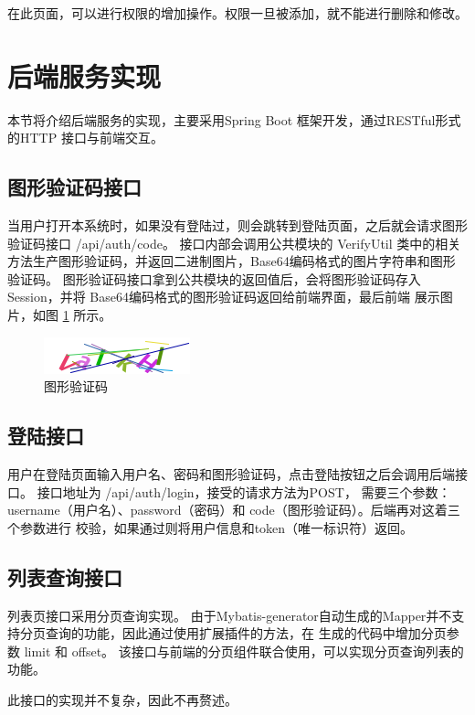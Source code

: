 在此页面，可以进行权限的增加操作。权限一旦被添加，就不能进行删除和修改。

\section{后端服务实现}
本节将介绍后端服务的实现，主要采用Spring Boot 框架开发，通过RESTful形式的HTTP 接口与前端交互。
\subsection{图形验证码接口}


当用户打开本系统时，如果没有登陆过，则会跳转到登陆页面，之后就会请求图形验证码接口 /api/auth/code。
接口内部会调用公共模块的 VerifyUtil 类中的相关方法生产图形验证码，并返回二进制图片，Base64编码格式的图片字符串和图形验证码。
图形验证码接口拿到公共模块的返回值后，会将图形验证码存入Session，并将 Base64编码格式的图形验证码返回给前端界面，最后前端
展示图片，如图 \ref{Fig:code_eg} 所示。

\begin{figure}[ht]
    \centering
    \includegraphics[width=0.5\linewidth]{./Figure/IMG_code.png}
    \caption{图形验证码}\label{Fig:code_eg}
\end{figure}

\subsection{登陆接口}
用户在登陆页面输入用户名、密码和图形验证码，点击登陆按钮之后会调用后端接口。
接口地址为 /api/auth/login，接受的请求方法为POST，
需要三个参数：username（用户名）、password（密码）和 code（图形验证码）。后端再对这着三个参数进行
校验，如果通过则将用户信息和token（唯一标识符）返回。

\subsection{列表查询接口}
列表页接口采用分页查询实现。
由于Mybatis-generator自动生成的Mapper并不支持分页查询的功能，因此通过使用扩展插件的方法，在
生成的代码中增加分页参数 limit 和 offset。
该接口与前端的分页组件联合使用，可以实现分页查询列表的功能。

此接口的实现并不复杂，因此不再赘述。

